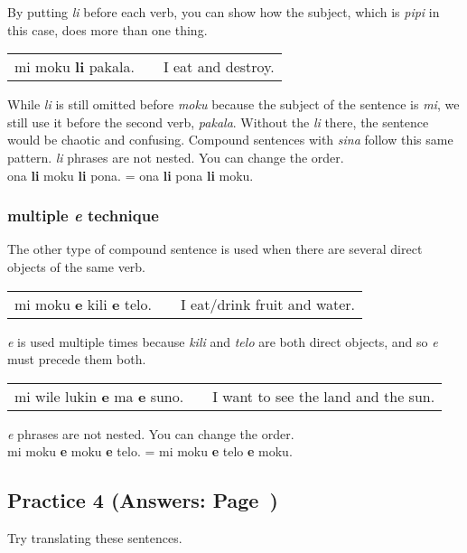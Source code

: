By putting \textit{li} before each verb, you can show how the subject, which is \textit{pipi} in this case, does more than one thing. 

\begin{supertabular}{p{5,5cm}|ll}
mi moku \textbf{li} pakala. && I eat and destroy. \\
\end{supertabular} 

While \textit{li} is still omitted before \textit{moku} because the subject of the sentence is \textit{mi}, we still use it before the second verb, \textit{pakala}. 
Without the \textit{li} there, the sentence would be chaotic and confusing. 
Compound sentences with \textit{sina} follow this same pattern. 
\textit{li} phrases are not nested. You can change the order. \\
ona \textbf{li} moku \textbf{li} pona. = ona \textbf{li} pona \textbf{li} moku. 
%
\label{'multiple_e'}
\subsubsection*{multiple \textit{e} technique}
%
The other type of compound sentence is used when there are several direct objects of the same verb.

\begin{supertabular}{p{5,5cm}|ll}
mi moku \textbf{e} kili \textbf{e} telo. && I eat/drink fruit and water. \\
\end{supertabular} 

\textit{e} is used multiple times because \textit{kili} and \textit{telo} are both direct objects, and so \textit{e} must precede them both. 

\begin{supertabular}{p{5,5cm}|ll}
mi wile lukin \textbf{e} ma \textbf{e} suno. && I want to see the land and the sun. \\
\end{supertabular} 
\textit{e} phrases are not nested. You can change the order. \\
mi moku \textbf{e} moku \textbf{e} telo. = mi moku \textbf{e} telo \textbf{e} moku. 
%
\subsection*{Practice 4 (Answers: Page~\pageref{'direct_objects_compund_sentences'})}
%
Try translating these sentences.  


